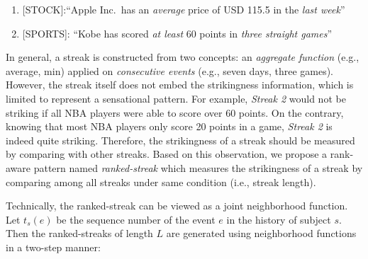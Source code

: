 
\begin{enumerate}
	\item{[STOCK]:``Apple Inc.~has an \emph{average} price of USD 115.5 in the \emph{last week}''}
	\item{[SPORTS]: ``Kobe has scored \emph{at least} 60 points in \emph{three straight games}'' }
\end{enumerate}
In general, a streak is constructed from two concepts: an \emph{aggregate function} (e.g., average, min)
applied on \emph{consecutive events} (e.g., seven days, three games). 
However, the streak itself does not embed the strikingness information, which is limited
to represent a sensational pattern. 
%
%
%
For example, \emph{Streak 2} would not be striking if all NBA players were able to score over 60 points. 
On the contrary, knowing that most NBA players only score 20 points in a game,
\emph{Streak 2} is indeed quite striking. 
Therefore, the strikingness of a streak should be measured by comparing with other streaks.
Based on this observation, we propose a rank-aware pattern named \emph{ranked-streak} which measures the strikingness of
a streak by comparing among all streaks under same condition (i.e., streak length).

Technically, the ranked-streak can be viewed as a joint neighborhood function. 
Let $t_s(e)$ be the sequence number of the event $e$ in the history of subject $s$.
Then the ranked-streaks of length $L$ are generated using neighborhood functions in a two-step manner: 

